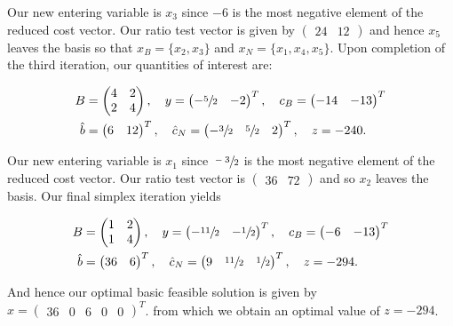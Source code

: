 \begin{solution}
  Our new entering variable is $x_3$ since $-6$ is the most negative element of the reduced cost vector. Our ratio test 
  vector is given by $\begin{pmatrix} 24 & 12 \end{pmatrix}$ and hence $x_5$ leaves the basis so that 
  $x_B = \{ x_2, x_3 \}$ and $x_N = \{ x_1, x_4, x_5 \}$. Upon completion of the third iteration, our quantities of 
  interest are:

  \begin{align*}
    B &= \begin{pmatrix}
      4 & 2 \\
      2 & 4
    \end{pmatrix}, \quad y = \begin{pmatrix}
      -\sfrac{5}{2} & -2
    \end{pmatrix}^T, \quad c_B = \begin{pmatrix}
      -14 & -13
    \end{pmatrix}^T \\
    \hat{b} &= \begin{pmatrix}
      6 & 12
    \end{pmatrix}^T, \quad \hat{c}_N = \begin{pmatrix}
      -\sfrac{3}{2} & \sfrac{5}{2} & 2
    \end{pmatrix}^T, \quad z = -240.
  \end{align*}

  Our new entering variable is $x_1$ since $\sfrac{-3}{2}$ is the most negative element of the reduced cost vector. Our
  ratio test vector is $\begin{pmatrix} 36 & 72 \end{pmatrix}$ and so $x_2$ leaves the basis. Our final
  simplex iteration yields


  \begin{align*}
    B &= \begin{pmatrix}
      1 & 2 \\
      1 & 4
    \end{pmatrix}, \quad y = \begin{pmatrix}
      -\sfrac{11}{2} & -\sfrac{1}{2}
    \end{pmatrix}^T, \quad c_B = \begin{pmatrix}
      -6 & -13
    \end{pmatrix}^T \\
    \hat{b} &= \begin{pmatrix}
      36 & 6
    \end{pmatrix}^T, \quad \hat{c}_N = \begin{pmatrix}
      9 & \sfrac{11}{2} & \sfrac{1}{2}
    \end{pmatrix}^T, \quad z = -294.
  \end{align*}

  And hence our optimal basic feasible solution is given by $x = \begin{pmatrix} 36 & 0 & 6 & 0 & 0 \end{pmatrix}^T$.
  from which we obtain an optimal value of $z = -294$.
\end{solution}
